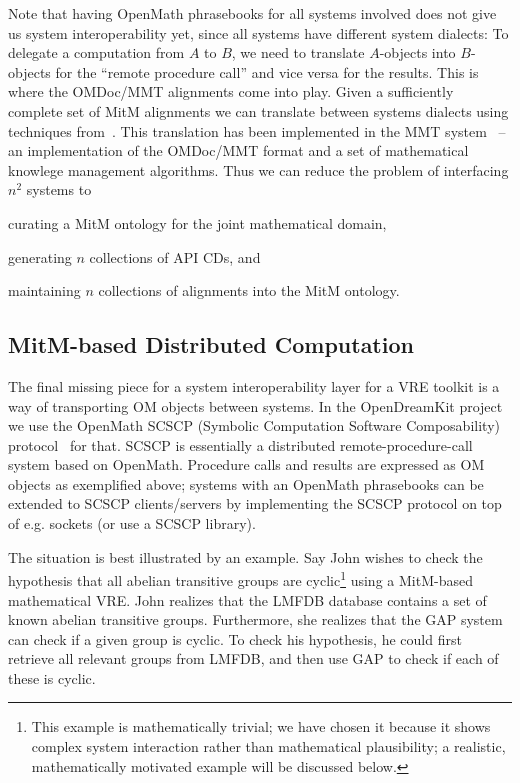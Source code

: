 Note that having OpenMath phrasebooks for all systems involved does not give us system interoperability yet, since all systems have different system dialects: 
To delegate a computation from $A$ to $B$, we need to translate $A$-objects into $B$-objects for the ``remote procedure call'' and vice versa for the results. This is where the OMDoc/MMT alignments come into play. 
Given a sufficiently complete set of MitM alignments we can translate between systems dialects using techniques from~\cite{MueRoYuRa:abtafs17}. This translation has been implemented in the MMT system~\cite{Rabe:MAGMS13,uniformal:on}   -- an implementation of the OMDoc/MMT format and a set of mathematical knowlege management algorithms. 
Thus we can reduce the problem of  interfacing $n^2$ systems to
\begin{inparaenum}[\em i\rm)]
\item curating a MitM ontology for the joint mathematical domain,
\item generating $n$ collections of API CDs, and 
\item maintaining $n$ collections of alignments into the MitM ontology.
\end{inparaenum}

\subsection{MitM-based Distributed Computation}\label{sec:mitm:comms}

The final missing piece for a system interoperability layer for a VRE toolkit is a way of transporting OM objects between systems. 
In the OpenDreamKit project we use the OpenMath SCSCP (Symbolic Computation Software Composability) protocol~\cite{SCSCP-1.3} for that. 
SCSCP is essentially a distributed remote-procedure-call system based on OpenMath. 
Procedure calls and results are expressed as OM objects as exemplified above; systems with an OpenMath phrasebooks can be extended to  SCSCP clients/servers by implementing the SCSCP protocol on top of e.g. sockets (or use a SCSCP library). 

The situation is best illustrated by an example. Say John wishes to check the hypothesis that all abelian transitive groups are cyclic\footnote{This example is mathematically trivial; we have chosen it because it shows complex system interaction rather than mathematical plausibility; a realistic, mathematically motivated example will be discussed below.} using a MitM-based mathematical VRE.
John realizes that the LMFDB database contains a set of known abelian transitive groups.
Furthermore, she realizes that the GAP system can check if a given group is cyclic. 
To check his hypothesis, he could first retrieve all relevant groups from LMFDB, and then use GAP to check if each of these is cyclic. 

